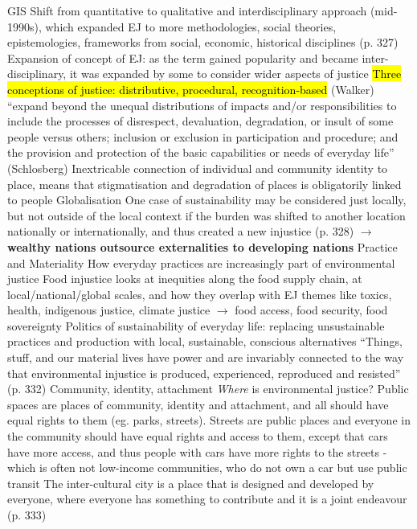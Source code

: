 \documentclass{article}
\begin{document}
\begin{outline}
		\2 GIS
		\2 Shift from quantitative to qualitative and interdisciplinary approach (mid-1990s), which expanded EJ to more methodologies, social theories, epistemologies, frameworks from social, economic, historical disciplines (p. 327)
	\1 Expansion of concept of EJ: as the term gained popularity and became inter-disciplinary, it was expanded by some to consider wider aspects of justice
		\2 \hl{Three conceptions of justice: distributive, procedural, recognition-based} (Walker)
		\2 ``expand beyond the unequal distributions of impacts and/or responsibilities to include the processes of disrespect, devaluation, degradation, or insult of some people versus others; inclusion or exclusion in participation and procedure; and the provision and protection of the basic capabilities or needs of everyday life'' (Schlosberg)
	\1 Inextricable connection of individual and community identity to place, means that stigmatisation and degradation of places is obligatorily linked to people
	\1 Globalisation
		\2 One case of sustainability may be considered just locally, but not outside of the local context if the burden was shifted to another location nationally or internationally, and thus created a new injustice (p. 328) $\rightarrow$ \textbf{wealthy nations outsource externalities to developing nations}
	\1 Practice and Materiality
		\2 How everyday practices are increasingly part of environmental justice
		\2 Food injustice looks at inequities along the food supply chain, at local/national/global scales, and how they overlap with EJ themes like toxics, health, indigenous justice, climate justice $\rightarrow$ food access, food security, food sovereignty
		\2 Politics of sustainability of everyday life: replacing unsustainable practices and production with local, sustainable, conscious alternatives
		\2 ``Things, stuff, and our material lives have power and are invariably connected to the way that environmental injustice is produced, experienced, reproduced and resisted'' (p. 332)
	\1 Community, identity, attachment
		\2 \textit{Where} is environmental justice?
		\2 Public spaces are places of community, identity and attachment, and all should have equal rights to them (eg. parks, streets). Streets are public places and everyone in the community should have equal rights and access to them, except that cars have more access, and thus people with cars have more rights to the streets - which is often not low-income communities, who do not own a car but use public transit
		\2 The inter-cultural city is a place that is designed and developed by everyone, where everyone has something to contribute and it is a joint endeavour (p. 333)

\end{outline}
\end{document}
